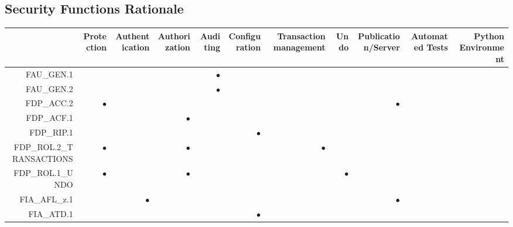 \documentclass[12pt,english]{scrbook}
\newcommand{\oh}{$\bullet$}
\begin{document}
\subsection{Security Functions Rationale}

\begin{longtable}{rRRRRRRRRRR}
        \toprule
                    & Protection & Authentication & Authorization & Auditing & Configuration & Transaction management & Undo & Publication/Server & Automated Tests & Python Environment \\
        \midrule\endhead
FAU\_GEN.1          &            &                &               & \oh      &               &                        &      &                    &                 &                    \\   
FAU\_GEN.2          &            &                &               & \oh      &               &                        &      &                    &                 &                    \\   
FDP\_ACC.2          & \oh        &                &               &          &               &                        &      & \oh                &                 &                    \\   
FDP\_ACF.1          &            &                &  \oh          &          &               &                        &      &                    &                 &                    \\   
FDP\_RIP.1          &            &                &               &          & \oh           &                        &      &                    &                 &                    \\   
FDP\_ROL.2\_TRANSACTIONS
                    & \oh        &                &  \oh          &          &               & \oh                    &      &                    &                 &                    \\   
FDP\_ROL.1\_UNDO    & \oh        &                &  \oh          &          &               &                        & \oh  &                    &                 &                    \\   
FIA\_AFL\_z.1       &            &  \oh           &               &          &               &                        &      & \oh                &                 &                    \\   
FIA\_ATD.1          &            &                &               &          & \oh           &                        &      &                    &                 &                    \\   

\end{longtable}
\end{document}
